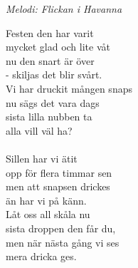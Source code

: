 {\footnotesize\textit{Melodi: Flickan i Havanna}}\par
\vspace{10pt}
Festen den har varit\\
mycket glad och lite våt\\
nu den snart är över\\
- skiljas det blir svårt.\\
Vi har druckit mången snaps\\
nu sägs det vara dags\\
sista lilla nubben ta\\
alla vill väl ha?\\
\\
Sillen har vi ätit\\
opp för flera timmar sen\\
men att snapsen drickes\\
än har vi på känn.\\
Låt oss all skåla nu\\
sista droppen den får du,\\
men när nästa gång vi ses\\
mera dricka ges.
